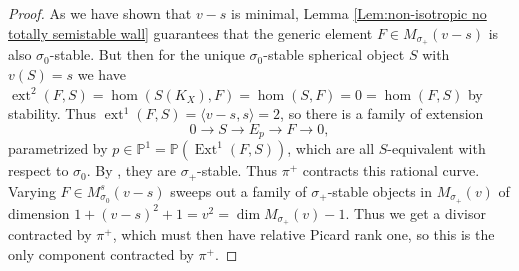 \documentclass[leqno,11pt]{amsart}
\def\P{\ensuremath{\mathbb{P}}}
\def\dim{\mathop{\mathrm{dim}}\nolimits}
\def\Ext{\mathop{\mathrm{Ext}}\nolimits}
\def\ext{\mathop{\mathrm{ext}}\nolimits}
\theoremstyle{definition}
\def\P{\ensuremath{\mathbb{P}}}
\begin{document}
\begin{proof}
As we have shown that $v-s$ is minimal, Lemma \ref{Lem:non-isotropic no totally semistable wall} guarantees that the generic element $F\in M_{\sigma_+}(v-s)$ is also $\sigma_0$-stable.  But then for the unique $\sigma_0$-stable spherical object $S$ with $v(S)=s$ we have $\ext^2(F,S)=\hom(S(K_X),F)=\hom(S,F)=0=\hom(F,S)$ by stability.  Thus $\ext^1(F,S)=\langle v-s,s\rangle=2$, so there is a family of extension $$0\to S\to E_p\to F\to 0,$$ parametrized by $p\in\P^1=\P(\Ext^1(F,S))$, which are all $S$-equivalent with respect to $\sigma_0$.  By \cite[Lemma 6.9]{BM14b}, they are $\sigma_+$-stable.  Thus $\pi^+$ contracts this rational curve.  Varying $F\in M_{\sigma_0}^s(v-s)$ sweeps out a family of $\sigma_+$-stable objects in $M_{\sigma_+}(v)$ of dimension $1+(v-s)^2+1=v^2=\dim M_{\sigma_+}(v)-1$.  Thus we get a divisor contracted by $\pi^+$, which must then have relative Picard rank one, so this is the only component contracted by $\pi^+$.  
\end{proof}
\end{document}
